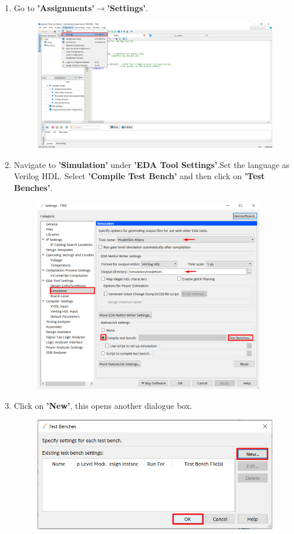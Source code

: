 \documentclass[12pt]{article}
\begin{document}
\begin{enumerate}
    \vspace{5mm}
    \\
    \item Go to \textbf{'Assignments'$\rightarrow$'Settings'}.
    \begin{figure}[H]
        \centering
    \includegraphics[width=14cm,keepaspectratio]{tws4.png}
    \end{figure}
    \item Navigate to \textbf{ 'Simulation'} under \textbf{'EDA Tool Settings'}.Set the language as Verilog HDL. Select \textbf{'Compile Test Bench'} and then click on \textbf{'Test Benches'}.
    \begin{figure}[H]
        \centering
    \includegraphics[width=10cm,keepaspectratio]{tws5.png}
    \end{figure}
    \newpage
    \item Click on \textbf{'New'}, this opens another dialogue box.
    \begin{figure}[H]
        \centering
    \includegraphics[width=14cm,keepaspectratio]{tws6.png}
    \end{figure}
    

\end{enumerate}
\end{document}
